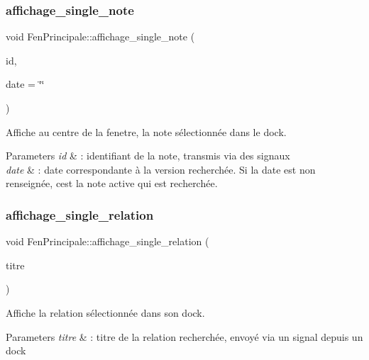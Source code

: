 \subsubsection{\texorpdfstring{affichage\+\_\+single\+\_\+note}{affichage\_single\_note}}
{\footnotesize\ttfamily void Fen\+Principale\+::affichage\+\_\+single\+\_\+note (\begin{DoxyParamCaption}\item[{Q\+String}]{id,  }\item[{Q\+String}]{date = {\ttfamily \char`\"{}\char`\"{}} }\end{DoxyParamCaption})\hspace{0.3cm}{\ttfamily [slot]}}



Affiche au centre de la fenetre, la note sélectionnée dans le dock. 


\begin{DoxyParams}{Parameters}
{\em id} & \+: identifiant de la note, transmis via des signaux \\
\hline
{\em date} & \+: date correspondante à la version recherchée. Si la date est non renseignée, c\textquotesingle{}est la note active qui est recherchée. \\
\hline
\end{DoxyParams}
\mbox{\label{class_fen_principale_a67e142066003277638ed8b7dc67b19e9}} 
\subsubsection{\texorpdfstring{affichage\+\_\+single\+\_\+relation}{affichage\_single\_relation}}
{\footnotesize\ttfamily void Fen\+Principale\+::affichage\+\_\+single\+\_\+relation (\begin{DoxyParamCaption}\item[{Q\+String}]{titre }\end{DoxyParamCaption})\hspace{0.3cm}{\ttfamily [slot]}}



Affiche la relation sélectionnée dans son dock. 


\begin{DoxyParams}{Parameters}
{\em titre} & \+: titre de la relation recherchée, envoyé via un signal depuis un dock \\
\hline
\end{DoxyParams}
\mbox{\label{class_fen_principale_ab3ef99b1adb06c0bcc57ea74ca34923e}} 
